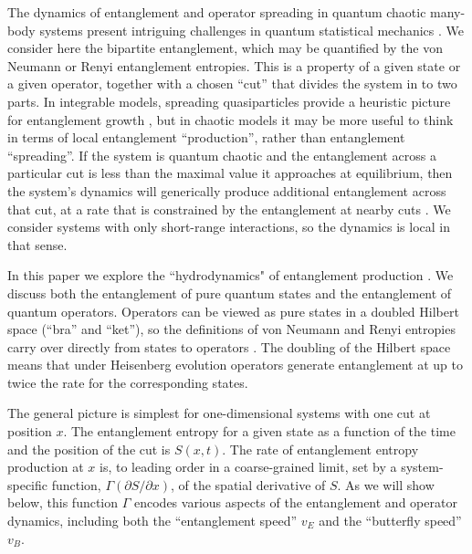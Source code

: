 \documentclass[aps,prx,twocolumn,superscriptaddress,floatfix,nofootinbib,prx]{revtex4}
\renewcommand{\>}{\right\rangle}
\newcommand{\<}{\left\langle}
\begin{document}
The dynamics of entanglement and operator spreading in quantum chaotic many-body systems present intriguing challenges in quantum statistical mechanics \cite{kh,liusuh,kaufman2016,asplund2015,sekino2008,maldacena2016,aleiner2016,roberts2016,casini,hosur2016,ha,nahum,ms,mezeiholography,gu2016,luitz,nahum3,keyserlingk,nahum2,amosandreajohn}.
We consider here the bipartite entanglement, which may be quantified by the von Neumann or Renyi entanglement entropies.  
This is a property of a given  state or a given operator,
together with a  chosen ``cut'' that divides the system in to two parts.  
In integrable models, spreading quasiparticles provide a heuristic picture for entanglement growth \cite{CCreview}, but in chaotic models 
it may be more useful to think in terms of  
local entanglement ``production'', rather than entanglement ``spreading''. 
If the system is quantum chaotic and the entanglement across a particular cut is less than the maximal value it approaches at equilibrium, then the system's dynamics will generically produce additional entanglement across that cut, at a rate that is constrained by the entanglement at nearby cuts \cite{nahum}.   We consider systems with only short-range interactions, so the dynamics is local in that sense.  

In this paper we explore the ``hydrodynamics" of entanglement production \cite{nahum}.  We discuss both  the entanglement of pure quantum states and the entanglement of quantum operators.
Operators can be viewed as pure states in a doubled Hilbert space (``bra'' and ``ket''), 
so the definitions of von Neumann and Renyi entropies carry over directly from states to operators \cite{zanardi,prosenpizorn,prosenpizorn2,luitz,dubail}. The doubling of the Hilbert space means that under Heisenberg evolution operators generate entanglement at up to twice the rate for  the corresponding states.

The general picture is simplest for one-dimensional systems with one cut at position $x$.  The entanglement entropy for a given 
state as a function of the time and the position of the cut is $S(x,t)$.  The rate of entanglement entropy production at $x$ is, to leading order in a coarse-grained limit, set by a system-specific function, $\Gamma(\partial S/\partial x)$, of the spatial derivative of $S$.  As we will show below, this function $\Gamma$ encodes various aspects of the entanglement and operator dynamics, including both the ``entanglement speed'' $v_E$ and the ``butterfly speed'' $v_B$.
\end{document}

